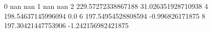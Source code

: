 0 nan nan
1 nan nan
2 229.57272338867188 31.026351928710938
4 198.54637145996094 0.0
6 197.54954528808594 -0.996826171875
8 197.30421447753906 -1.242156982421875
